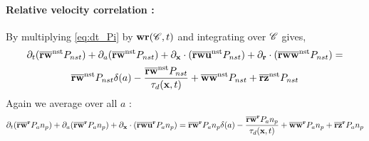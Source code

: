 \paragraph{Relative velocity correlation :}
By multiplying \ref{eq:dt_Pi} by $\textbf{wr} (\mathscr{C},t)$ and integrating over $\mathscr{C}$ gives,
\begin{multline}
    \partial_t (\overline{\textbf{rw}}^\text{nst} P_{nst})
    + \partial_a (\overline{\textbf{rw}}^\text{nst} P_{nst})
    + \partial_{\textbf{x}} \cdot (\overline{\textbf{rw}\textbf{u} }^\text{nst} P_{nst})
    + \partial_{\textbf{r}}  \cdot (\overline{\textbf{rw}\textbf{w}}^\text{nst} P_{nst})
    =  \\
    \overline{\textbf{rw}}^\text{nst} P_{nst}\delta(a)
    -  \frac{\overline{\textbf{rw}}^\text{nst} P_{nst}}{\tau_d(\textbf{x},t)}
    + \overline{\textbf{ww}}^\text{nst}P_{nst}
    + \overline{\textbf{rz}}^\text{nst}P_{nst}
\end{multline}
Again we average over all $a$ : 
\begin{multline}
    \partial_t (\overline{\textbf{rw}}^{\textbf{r}} P_{a}n_p)
    + \partial_a (\overline{\textbf{rw}}^{\textbf{r}} P_{a}n_p)
    + \partial_{\textbf{x}} \cdot (\overline{\textbf{rw}\textbf{u} }^{\textbf{r}} P_{a}n_p)
    =  
    \overline{\textbf{rw}}^{\textbf{r}} P_{a}n_p\delta(a)
    -  \frac{\overline{\textbf{rw}}^{\textbf{r}} P_{a}n_p}{\tau_d(\textbf{x},t)}
    + \overline{\textbf{ww}}^{\textbf{r}}P_{a}n_p
    + \overline{\textbf{rz}}^{\textbf{r}}P_{a}n_p
\end{multline}


